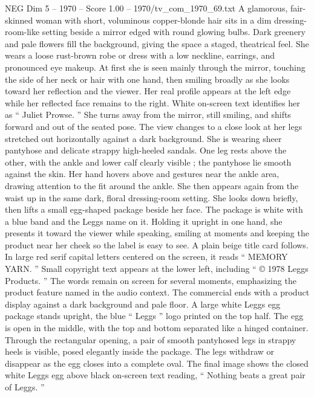 \begin{textsample}{NEG Dim 5 – 1970 – Score 1.00 – 1970/tv\_com\_1970\_69.txt}  \label{ex:f5_neg_019}
A glamorous, fair-skinned woman with short, voluminous copper-blonde hair sits in a dim dressing-room-like setting beside a mirror edged with round glowing bulbs.
Dark greenery and pale flowers fill the background, giving the space a staged, theatrical feel.
She wears a loose rust-brown robe or dress with a low neckline, earrings, and pronounced eye makeup.
At first she is seen mainly through the mirror, touching the side of her neck or hair with one hand, then smiling broadly as she looks toward her reflection and the viewer.
Her real profile appears at the left edge while her reflected face remains to the right.
White on-screen text identifies her as “ Juliet Prowse. ” She turns away from the mirror, still smiling, and shifts forward and out of the seated pose.
The view changes to a close look at her legs stretched out horizontally against a dark background.
She is wearing sheer pantyhose and delicate strappy high-heeled sandals.
One leg rests above the other, with the ankle and lower calf clearly visible ; the pantyhose lie smooth against the skin.
Her hand hovers above and gestures near the ankle area, drawing attention to the fit around the ankle.
She then appears again from the waist up in the same dark, floral dressing-room setting.
She looks down briefly, then lifts a small egg-shaped package beside her face.
The package is white with a blue band and the Leggs name on it.
Holding it upright in one hand, she presents it toward the viewer while speaking, smiling at moments and keeping the product near her cheek so the label is easy to see.
A plain beige title card follows.
In large red serif capital letters centered on the screen, it reads “ MEMORY YARN. ” Small copyright text appears at the lower left, including “ {\EmojiFont ©} 1978 Leggs Products. ” The words remain on screen for several moments, emphasizing the product feature named in the audio context.
The commercial ends with a product display against a dark background and pale floor.
A large white Leggs egg package stands upright, the blue “ Leggs ” logo printed on the top half.
The egg is open in the middle, with the top and bottom separated like a hinged container.
Through the rectangular opening, a pair of smooth pantyhosed legs in strappy heels is visible, posed elegantly inside the package.
The legs withdraw or disappear as the egg closes into a complete oval.
The final image shows the closed white Leggs egg above black on-screen text reading, “ Nothing beats a great pair of Leggs. ”

\end{textsample}
